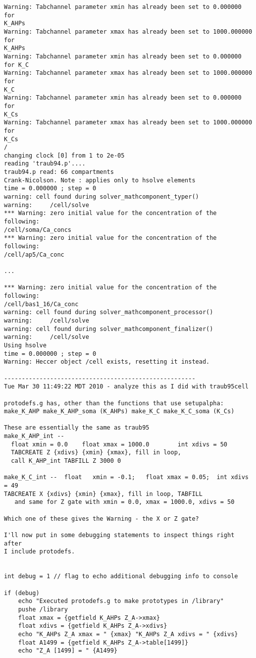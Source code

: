 \documentclass[12pt]{article}
\begin{document}
\begin{verbatim}
Warning: Tabchannel parameter xmin has already been set to 0.000000 for
K_AHPs
Warning: Tabchannel parameter xmax has already been set to 1000.000000 for
K_AHPs
Warning: Tabchannel parameter xmin has already been set to 0.000000 for K_C
Warning: Tabchannel parameter xmax has already been set to 1000.000000 for
K_C
Warning: Tabchannel parameter xmin has already been set to 0.000000 for
K_Cs
Warning: Tabchannel parameter xmax has already been set to 1000.000000 for
K_Cs
/
changing clock [0] from 1 to 2e-05
reading 'traub94.p'.... 
traub94.p read: 66 compartments
Crank-Nicolson. Note : applies only to hsolve elements
time = 0.000000 ; step = 0          
warning: cell found during solver_mathcomponent_typer()
warning:     /cell/solve
*** Warning: zero initial value for the concentration of the following:
/cell/soma/Ca_concs
*** Warning: zero initial value for the concentration of the following:
/cell/ap5/Ca_conc

...

*** Warning: zero initial value for the concentration of the following:
/cell/bas1_16/Ca_conc
warning: cell found during solver_mathcomponent_processor()
warning:     /cell/solve
warning: cell found during solver_mathcomponent_finalizer()
warning:     /cell/solve
Using hsolve
time = 0.000000 ; step = 0          
Warning: Heccer object /cell exists, resetting it instead.

------------------------------------------------------
Tue Mar 30 11:49:22 MDT 2010 - analyze this as I did with traub95cell

protodefs.g has, other than the functions that use setupalpha:
make_K_AHP make_K_AHP_soma (K_AHPs) make_K_C make_K_C_soma (K_Cs)

These are essentially the same as traub95
make_K_AHP_int -- 
  float xmin = 0.0	  float xmax = 1000.0	     int xdivs = 50
  TABCREATE Z {xdivs} {xmin} {xmax}, fill in loop,
  call K_AHP_int TABFILL Z 3000 0

make_K_C_int --	 float	 xmin = -0.1;	float xmax = 0.05;  int xdivs = 49
TABCREATE X {xdivs} {xmin} {xmax}, fill in loop, TABFILL
   and same for Z gate with xmin = 0.0, xmax = 1000.0, xdivs = 50

Which one of these gives the Warning - the X or Z gate?

I'll now put in some debugging statements to inspect things right after
I include protodefs.


int debug = 1 // flag to echo additional debugging info to console

if (debug)
    echo "Executed protodefs.g to make prototypes in /library"
    pushe /library
    float xmax = {getfield K_AHPs Z_A->xmax}
    float xdivs = {getfield K_AHPs Z_A->xdivs}
    echo "K_AHPs Z_A xmax = " {xmax} "K_AHPs Z_A xdivs = " {xdivs} 
    float A1499 = {getfield K_AHPs Z_A->table[1499]}
    echo "Z_A [1499] = " {A1499}


\end{verbatim}
\end{document}
